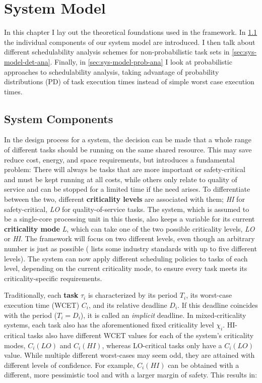 \documentclass[a4paper,oneside]{csthesis}
\begin{document}
\chapter{System Model}
\label{cha:sys-model}
In this chapter I lay out the theoretical foundations used in the framework. In \cref{sec:sys-model-components} the individual components of our system model are introduced. I then talk about different schedulability analysis schemes for non-probabilistic task sets in \cref{sec:sys-model-det-ana}. Finally, in \cref{sec:sys-model-prob-ana} I look at probabilistic approaches to schedulability analysis, taking advantage of probability distributions (PD) of task execution times instead of simple worst case execution times.

\section{System Components}
\label{sec:sys-model-components}
In the design process for a system, the decision can be made that a whole range of different tasks should be running on the same shared resource. This may save reduce cost, energy, and space requirements, but introduces a fundamental problem: There will always be tasks that are more important or safety-critical and must be kept running at all costs, while others only relate to quality of service and can be stopped for a limited time if the need arises. To differentiate between the two, different \textbf{criticality levels} are associated with them; \textit{HI} for safety-critical, \textit{LO} for quality-of-service tasks. The system, which is assumed to be a single-core processing unit in this thesis, also keeps a variable for its current \textbf{criticality mode} \textit{L}, which can take one of the two possible criticality levels, \textit{LO} or \textit{HI}. The framework will focus on two different levels, even though an arbitrary number is just as possible (\cite{burns2013mixed} lists some industry standards with up to five different levels). The system can now apply different scheduling policies to tasks of each level, depending on the current criticality mode, to ensure every task meets its criticality-specific requirements.

Traditionally, each \textbf{task} $\tau_i$ is characterized by its period $T_i$, its worst-case execution time (WCET) $C_i$, and its relative deadline $D_i$. If this deadline coincides with the period ($T_i = D_i$), it is called an \textit{implicit} deadline. In mixed-criticality systems, each task also has the aforementioned fixed criticality level $\chi_i$. HI-critical tasks also have different WCET values for each of the system's criticality modes, $C_i(LO)$ and $C_i(HI)$, whereas LO-critical tasks only have a $C_i(LO)$ value. While multiple different worst-cases may seem odd, they are attained with different levels of confidence. For example, $C_i(HI)$ can be obtained with a different, more pessimistic tool and with a larger margin of safety. This results in:
\end{document}
